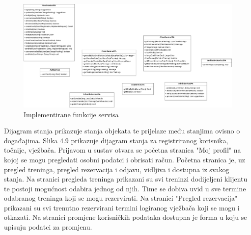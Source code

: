 	\begin{figure}[H]
		\includegraphics[scale=0.275]{./Dijagrami/services_methods.png}
		\centering
		\caption{Implementirane funkcije servisa}
		\label{fig:promjene}
	\end{figure}
	
		
		
		
		
		
	
		
		
	\noindent Dijagram stanja prikazuje stanja objekata te prijelaze među stanjima ovisno o događajima. Slika 4.9 prikazuje dijagram stanja za registriranog korisnika, točnije, vježbača. Prijavom u sustav otvara se početna stranica "Moj profil" na kojoj se mogu pregledati osobni podatci i obrisati račun. Početna stranica je, uz pregled treninga, pregled rezervacija i odjavu, vidljiva i dostupna iz svakog stanja. Na stranici pregleda treninga prikazani su svi treninzi dodijeljeni klijentu te postoji mogućnost odabira jednog od njih. Time se dobiva uvid u sve termine odabranog treninga koji se mogu rezervirati. Na stranici "Pregled rezervacija" prikazani su svi trenutno rezervirani termini logiranog vježbača koji se mogu i otkazati. Na stranici promjene korisničkih podataka dostupna je forma u koju se upisuju podatci za promjenu. 
  
